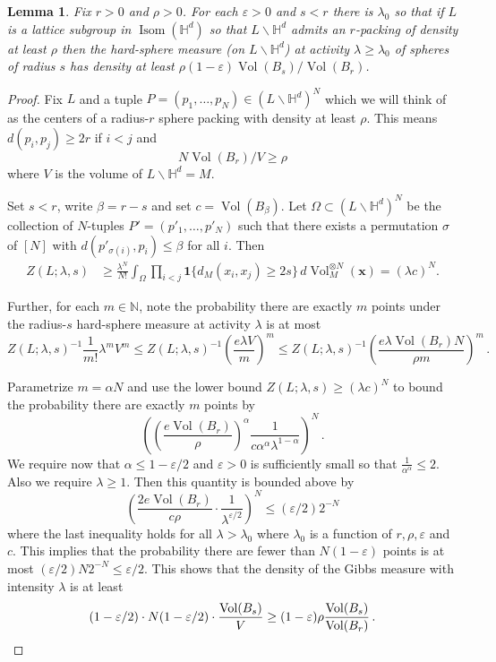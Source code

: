 \documentclass[11pt]{amsart}
\newtheorem{lemma}[theorem]{Lemma}
\theoremstyle{definition}
\theoremstyle{remark}
\renewcommand{\H}{\mathbb{H}}
\newcommand{\s}{\sigma}
\newcommand{\Isom}{\operatorname{Isom}}
\newcommand{\Vol}{\operatorname{Vol}}
\newcommand{\eps}{\varepsilon}
\newcommand{\one}{\mathbf{1}}
\begin{document}
\begin{lemma}\label{lem:packing-to-gibbs}
    Fix $r > 0$ and $\rho > 0$.  For each $\eps > 0$ and $s < r$ there is $\lambda_0$  so that if $L$ is a lattice subgroup in $\Isom(\H^d)$ so that $L \backslash \H^d$ admits an $r$-packing of density at least $\rho$ then the hard-sphere measure (on $L \backslash \H^d$) at activity $\lambda \geq \lambda_0$ of spheres of radius $s$ has density at least $\rho (1-\eps)\Vol(B_s)/\Vol(B_r)$.
\end{lemma}
\begin{proof}
    Fix $L$ and a tuple $P=(p_1,\ldots, p_N) \in (L \backslash \H^d)^N$ which we will think of as the centers of a radius-$r$ sphere packing with density at least $\rho$. This means $d(p_i,p_j) \ge 2r$ if $i<j$ and 
    $$N \Vol(B_r)/V\ge \rho$$
    where $V$ is the volume of $L \backslash \H^d=M$. 
    
    Set $s < r$, write $\beta = r - s$ and set $c = \Vol(B_\beta)$.  Let $\Omega \subset (L \backslash \H^d)^N$ be the collection of $N$-tuples $P'=(p'_1,\ldots, p'_N)$ such that there exists a permutation $\s$ of $[N]$ with $d(p'_{\s(i)},p_i) \le \beta$ for all $i$.  Then
    \begin{align*}
        Z(L;\lambda,s) 
        &\ge \frac{\lambda^N}{N!} \int_{\Omega} \prod_{i < j} \one\{d_M(x_i,x_j) \geq 2s\} \,d\Vol_M^{\otimes N}(\mathbf{x}) = (\lambda c)^N. 
    \end{align*}   
    


 

    Further, for each $m\in \mathbb{N}$, note the probability there are exactly $m$ points under the radius-$s$ hard-sphere measure at activity $\lambda$ is at most
    $$Z(L;\lambda,s)^{-1}\frac{1}{m!}\lambda^m V^m \leq Z(L;\lambda,s)^{-1}\left(\frac{e \lambda V}{m} \right)^m \leq Z(L;\lambda,s)^{-1}\left(\frac{e \lambda \Vol(B_r)  N}{\rho m} \right)^m\,. $$

    Parametrize $m = \alpha N$ and use the lower bound $Z(L;\lambda,s) 
        \ge (\lambda c)^N$ to bound the probability there are exactly $m$ points by
    $$ \left(\left(\frac{e \Vol(B_r)}{\rho} \right)^\alpha \frac{1}{c\alpha^\alpha \lambda^{1 - \alpha}} \right)^N\,.  $$
    We require now that $\alpha \leq 1-\eps/2$ and $\eps>0$ is sufficiently small so that $\frac{1}{\alpha^\alpha} \le 2$. Also we require $\lambda \geq 1$. Then this quantity is bounded above by \begin{equation}
        \left(\frac{2 e \Vol(B_r)}{c\rho}  \cdot \frac{1}{ \lambda^{\eps/2}} \right)^N \leq (\eps/2) 2^{-N}
    \end{equation} 
    where the last inequality holds for all $\lambda > \lambda_0$ where $\lambda_0$ is a function of $r,\rho,\eps$ and $c$.  This implies that the probability there are fewer than $N(1-\eps)$ points is at most $(\eps/2) N 2^{-N} \leq \eps/2$.  This shows that the density of the Gibbs measure with intensity $\lambda$ is at least \begin{equation*}(1- \eps/2)\cdot N(1 - \eps/2) \cdot \frac{\Vol(B_s)}{V} \geq (1 - \eps) \rho \frac{\Vol(B_s)}{\Vol(B_r)}\,. \qedhere \end{equation*}
\end{proof}
\end{document}
